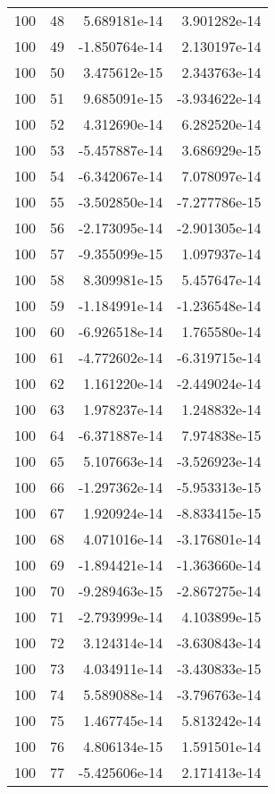 \begin{tabular}{rrrr}
 100 &   48 &  5.689181e-14 &  3.901282e-14 \\
 100 &   49 & -1.850764e-14 &  2.130197e-14 \\
 100 &   50 &  3.475612e-15 &  2.343763e-14 \\
 100 &   51 &  9.685091e-15 & -3.934622e-14 \\
 100 &   52 &  4.312690e-14 &  6.282520e-14 \\
 100 &   53 & -5.457887e-14 &  3.686929e-15 \\
 100 &   54 & -6.342067e-14 &  7.078097e-14 \\
 100 &   55 & -3.502850e-14 & -7.277786e-15 \\
 100 &   56 & -2.173095e-14 & -2.901305e-14 \\
 100 &   57 & -9.355099e-15 &  1.097937e-14 \\
 100 &   58 &  8.309981e-15 &  5.457647e-14 \\
 100 &   59 & -1.184991e-14 & -1.236548e-14 \\
 100 &   60 & -6.926518e-14 &  1.765580e-14 \\
 100 &   61 & -4.772602e-14 & -6.319715e-14 \\
 100 &   62 &  1.161220e-14 & -2.449024e-14 \\
 100 &   63 &  1.978237e-14 &  1.248832e-14 \\
 100 &   64 & -6.371887e-14 &  7.974838e-15 \\
 100 &   65 &  5.107663e-14 & -3.526923e-14 \\
 100 &   66 & -1.297362e-14 & -5.953313e-15 \\
 100 &   67 &  1.920924e-14 & -8.833415e-15 \\
 100 &   68 &  4.071016e-14 & -3.176801e-14 \\
 100 &   69 & -1.894421e-14 & -1.363660e-14 \\
 100 &   70 & -9.289463e-15 & -2.867275e-14 \\
 100 &   71 & -2.793999e-14 &  4.103899e-15 \\
 100 &   72 &  3.124314e-14 & -3.630843e-14 \\
 100 &   73 &  4.034911e-14 & -3.430833e-15 \\
 100 &   74 &  5.589088e-14 & -3.796763e-14 \\
 100 &   75 &  1.467745e-14 &  5.813242e-14 \\
 100 &   76 &  4.806134e-15 &  1.591501e-14 \\
 100 &   77 & -5.425606e-14 &  2.171413e-14 \\

\end{tabular}
